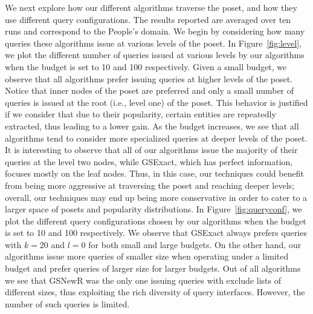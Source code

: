 \vspace{2pt}
We next explore how our different algorithms traverse the poset, and how they use different query configurations. The results reported are averaged over ten runs and correspond to the People's domain. We begin by considering how many queries these algorithms issue at various levels of the poset. In Figure~\ref{fig:level}, we plot the different number of queries issued at various levels by our algorithms when the budget is set to 10 and 100 respectively. Given a small budget, we observe that all algorithms prefer issuing queries at higher levels of the poset. Notice that inner nodes of the poset are preferred and only a small number of queries is issued at the root (i.e., level one) of the poset. This behavior is justified if we consider that due to their popularity, certain entities are repeatedly extracted, thus leading to a lower gain. As the budget increases, we see that all algorithms tend to consider more specialized queries at deeper levels of the poset. It is interesting to observe that all of our algorithms issue the majority of their queries at the level two nodes, while GSExact, which has perfect information, focuses mostly on the leaf nodes. Thus, in this case, our techniques could benefit from being more aggressive at traversing the poset and reaching deeper levels; overall, our techniques may end up being more conservative in order to cater to a larger space of posets and popularity distributions. In Figure~\ref{fig:queryconf}, we plot the different query configurations chosen by our algorithms when the budget is set to 10 and 100 respectively. We observe that GSExact always prefers queries with $k = 20$ and $l = 0$ for both small and large budgets. On the other hand, our algorithms issue more queries of smaller size when operating under a limited budget and prefer queries of larger size for larger budgets. Out of all algorithms we see that GSNewR was the only one issuing queries with exclude lists of different sizes, thus exploiting the rich diversity of query interfaces. However, the number of such queries is limited. 


